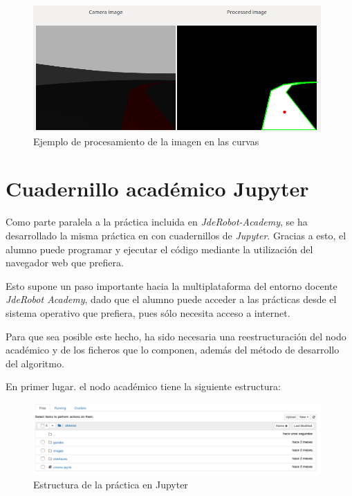 \begin{figure}[H]
  \begin{center}
    \includegraphics[width=0.98\textwidth]{figures/filtrado_curvas_chrono.png}
		\caption{Ejemplo de procesamiento de la imagen en las curvas}
		\label{fig.pdiecch}
		\end{center}
\end{figure}

\section{Cuadernillo académico Jupyter}
Como parte paralela a la práctica incluida en \textit{JdeRobot-Academy}, se ha desarrollado la misma práctica en con cuadernillos de \textit{Jupyter}. Gracias a esto, el alumno puede programar y ejecutar el código mediante la utilización del navegador web que prefiera.

Esto supone un paso importante hacia la multiplataforma del entorno docente \textit{JdeRobot Academy}, dado que el alumno puede acceder a las prácticas desde el sistema operativo que prefiera, pues sólo necesita acceso a internet.

Para que sea posible este hecho, ha sido necesaria una reestructuración del nodo académico y de los ficheros que lo componen, además del método de desarrollo del algoritmo.

En primer lugar. el nodo académico tiene la siguiente estructura:

\begin{figure}[H]
  \begin{center}
    \includegraphics[width=0.98\textwidth]{figures/estructura_jupyter.png}
		\caption{Estructura de la práctica en Jupyter}
		\label{fig.ejch}
		\end{center}
\end{figure}

